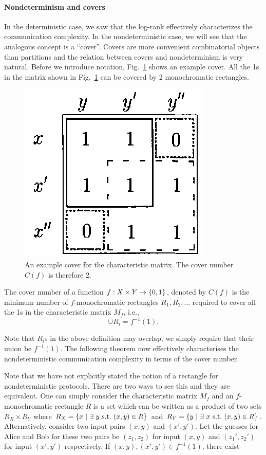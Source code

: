 \documentclass[usletter]{article}
\providecommand\cbrac[1]{\ensuremath \left\{#1\right\}}
\newcommand{\X}{X}
\newcommand{\Y}{Y}
\newcommand{\mf}{M_f}
\newcommand{\cf}{C(f)}
\newcommand{\pc}[2]{{\color{brown} #1}\marginpar{\tiny\noindent{\raggedright{\color{ForestGreen}[PC]}\color{brown}{ #2} \par}}}
\begin{document}
\paragraph{Nondeterminism and covers}
In the deterministic case, we saw that the log-rank effectively characterizes the communication complexity. In the nondeterministic case, we will see that the analogous concept is a ``cover''. Covers are more convenient combinatorial objects than partitions and the relation between covers and nondeterminism is very natural. Before we introduce notation, Fig.~\ref{fig:cover_example} shows an example cover. All the 1s in the matrix shown in Fig.~\ref{fig:cover_example} can be covered by 2 monochromatic rectangles.
\begin{figure}
\centering
\includegraphics[width=0.3 \textwidth]{cover_example}
\caption{An example cover for the characteristic matrix. The cover number $\cf$ is therefore 2.}
\label{fig:cover_example}
\end{figure}

\begin{definition}
The cover number of a function $f : \X \times \Y \to \cbrac{0,1}$, denoted by $\cf$ is the minimum number of $f$-monochromatic rectangles $R_1, R_2, \ldots$ required to cover all the 1s in the characteristic matrix $\mf$, i.e.,
$$
\cup R_i = f^{-1}(1).
$$
\end{definition}
Note that $R_i$s in the above definition may overlap, we simply require that their union be $f^{-1}(1)$. The following theorem now effectively characterises the nondeterministic communication complexity in terms of the cover number.

Note that we have not explicitly stated the notion of a rectangle for nondeterministic protocols. There are two ways to see this and they are equivalent. One can simply consider the characteristic matrix $\mf$ and an $f$-monochromatic rectangle $R$ is a set which can be written as a product of two sets $R_X \times R_Y$ where $R_X = \cbrac{ x\ |\ \exists\ y\ \mathrm{s.t.}\ (x,y) \in R}$ and $R_Y = \cbrac{ y\ |\ \exists\ x\ \mathrm{s.t.}\ (x,y) \in R}$. Alternatively, consider two input pairs $(x,y)$ and $(x', y')$. Let the guesses for Alice and Bob for these two pairs be $(z_1, z_2)$ for input $(x,y)$ and $(z_1', z_2')$ for input $(x',y')$ respectively. \pc{If $(x,y), (x',y') \in f^{-1}(1)$, there exist}{}
\end{document}
